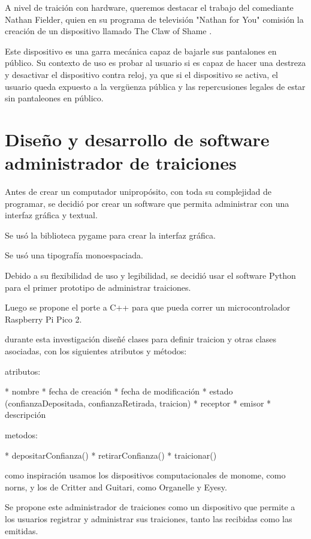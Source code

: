\documentclass{article}
\begin{document}
A nivel de traición con hardware, queremos destacar el trabajo del comediante Nathan Fielder, quien en su programa de televisión "Nathan for You" comisión la creación de un dispositivo llamado The Claw of Shame \cite{clawOfShame}.

Este dispositivo es una garra mecánica capaz de bajarle sus pantalones en público. Su contexto de uso es probar al usuario si es capaz de hacer una destreza y desactivar el dispositivo contra reloj, ya que si el dispositivo se activa, el usuario queda expuesto a la vergüenza pública y las repercusiones legales de estar sin pantaleones en público.

\clearpage

\section{Diseño y desarrollo de software administrador de traiciones}

Antes de crear un computador unipropósito, con toda su complejidad de programar, se decidió por crear un software que permita administrar con una interfaz gráfica y textual.

Se usó la biblioteca pygame para crear la interfaz gráfica.

Se usó una tipografía monoespaciada.

Debido a su flexibilidad de uso y legibilidad, se decidió usar el software Python para el primer prototipo de administrar traiciones.

Luego se propone el porte a C++ para que pueda correr un microcontrolador Raspberry Pi Pico 2.

durante esta investigación diseñé clases para definir traicion y otras clases asociadas, con los siguientes atributos y métodos:

atributos:

* nombre
* fecha de creación
* fecha de modificación
* estado (confianzaDepositada, confianzaRetirada, traicion)
* receptor
* emisor
* descripción

metodos:

* depositarConfianza()
* retirarConfianza()
* traicionar()

como inspiración usamos los dispositivos computacionales de monome, como norns, y los de Critter and Guitari, como Organelle y Eyesy.

Se propone este administrador de traiciones como un dispositivo que permite a los usuarios registrar y administrar sus traiciones, tanto las recibidas como las emitidas.
\end{document}
